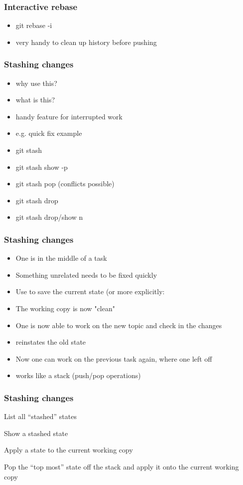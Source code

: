 \documentclass{git_course}
\begin{document}
\begin{frame}
\frametitle{Interactive rebase}
\begin{itemize}
    \item git rebase -i
    \item very handy to clean up history before pushing
\end{itemize}
\end{frame}

\begin{frame}
\frametitle{Stashing changes}
\begin{itemize}
    \item why use this?
    \item what is this?
    \item handy feature for interrupted work
    \item e.g. quick fix example
    \item git stash
    \item git stash show -p
    \item git stash pop (conflicts possible)
    \item git stash drop
    \item git stash drop/show {n}
\end{itemize}
\end{frame}

\begin{frame}
\frametitle{Stashing changes}
\begin{itemize}
    \item One is in the middle of a task
    \item Something unrelated needs to be fixed quickly
    \item Use  to save the current state (or more
        explicitly: 
    \item The working copy is now "clean"
    \item One is now able to work on the new topic and check in the
        changes
    \item {} reinstates the old state
    \item Now one can work on the previous task again, where one
        left off
    \item {} works like a stack (push/pop operations)
\end{itemize}
\end{frame}

\begin{frame}
\frametitle{Stashing changes}

\begin{description}
    \item {} List all “stashed” states
    \item {} Show a stashed state
    \item {} Apply a state to the current working copy
    \item {} Pop the “top most” state off the stack and
        apply it onto the current working copy
\end{description}
\end{frame}
\end{document}

